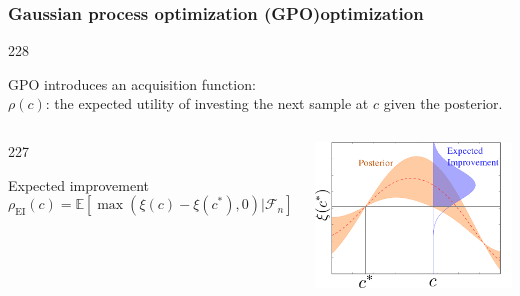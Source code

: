 \documentclass{beamer}
\let\oldcite=\cite
\renewcommand{\cite}[1]{\textcolor[rgb]{.4,.4,.85}{\oldcite{#1}}}
\newcommand{\barrow}{\item[\color{darkred}\ding{228}]}
\newcommand{\carrow}{\item[\color{darkred}\ding{227}]}
\begin{document}
\begin{frame}
    \frametitle{Gaussian process optimization (GPO)\hfill \scriptsize{optimization}} \small
    \begin{dinglist}{228}
        \barrow GPO introduces an acquisition function:\\
                $\rho(c)$: the expected utility of investing the next sample at $c$ given 
                the posterior.
        \begin{columns}
            \begin{dinglist}{227}
                \carrow Expected improvement \\ \scriptsize\cite{Mokus 78, Snoek 12}\small
                   \begin{equation*}
                       \rho_{\textrm{EI}}(c) = \mathbb{E}
                       \left[ \max\left(\xi(c) - \xi(c^*), 0\right) | \mathcal{F}_n \right]
                   \end{equation*}
            \end{dinglist}
        \begin{center}
            \includegraphics[width=6.1cm]{EI_sketch.png}
        \end{center}
        \end{columns}
    \end{dinglist}
\end{frame}
\end{document}
